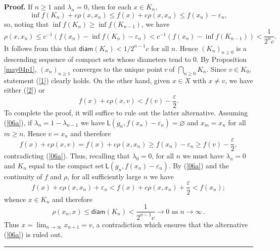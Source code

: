 \documentclass[11pt]{article}%
\newenvironment{proof}[1][Proof]{\noindent\textbf{#1.} }{\ \rule{0.5em}{0.5em}}
\begin{document}
\begin{proof}
If $n\geqslant1$ and $\lambda_{n}=0$, then for each $x\in K_{n}$,%
\[
\inf f(K_{n})+c\rho\left(  x,x_{n}\right)  \leqslant f\left(  x\right)
+c\rho\left(  x,x_{n}\right)  \leqslant f\left(  x_{n}\right)  -\varepsilon
_{n},
\]
so, noting that $\inf f(K_{n})\geqslant\inf f(K_{n-1})$, we have
\[
\rho\left(  x,x_{n}\right)  \leqslant c^{-1}(f\left(  x_{n}\right)  -\inf
f(K_{n})-\varepsilon_{n})<c^{-1}(f\left(  x_{n}\right)  -\inf f(K_{n-1}%
))<\frac{1}{2^{n}c}.
\]
It follows from this that $\mathsf{diam}(K_{n})<1/2^{n-1}c$ for all $n$. Hence
$\left(  K_{n}\right)  _{n\geqslant0}$ is a descending sequence of compact
sets whose diameters tend to $0$. By Proposition \ref{may04p1}, $\left(
x_{n}\right)  _{n\geqslant1}$ converges to the unique point$\ v~$of $%
{\textstyle\bigcap_{n\geqslant0}}
K_{n}$. Since $v\in K_{0}$, statement (\ref{1}) clearly holds. On the other
hand, given $x\in X$ with $x\neq v$, we have either (\ref{2}) or%
\begin{equation}
f\left(  x\right)  +c\rho\left(  x,v\right)  <f\left(  v\right)
-\frac{\varepsilon}{2}. \label{06a}%
\end{equation}
To complete the proof, it will suffice to rule out the latter alternative.
Assuming (\ref{06a}), if $\lambda_{n}=1-\lambda_{n-1}$ we have $\mathsf{L}%
(g_{n},f(x_{n})-\varepsilon_{n})=\varnothing$ and $x_{m}=x_{n}$ for all
$m\geqslant n$. Hence $v=x_{n}$ and therefore%
\[
f\left(  x\right)  +c\rho\left(  x,v\right)  =f\left(  x\right)  +c\rho\left(
x,x_{n}\right)  \geqslant f\left(  x_{n}\right)  -\varepsilon_{n}\geqslant
f\left(  v\right)  -\frac{\varepsilon}{2},
\]
contradicting (\ref{06a}). Thus, recalling that $\lambda_{0}=0$, for all $n$
we must have $\lambda_{n}=0$ and $K_{n}$ equal to the compact set$\ \mathsf{L}%
(g_{n},f(x_{n})-\varepsilon_{n})$. By (\ref{06a}) and the continuity of $f $
and $\rho$, for all sufficiently large $n$ we have%
\[
f(x)+c\rho(x,x_{n})+\varepsilon_{n}<f(x)+c\rho(x,x_{n})+\frac{\varepsilon}%
{2}<f(x_{n});
\]
whence $x\in K_{n}$ and therefore%
\[
\rho(x_{n},x)\leqslant\mathsf{diam}(K_{n})<\frac{1}{2^{n-1}c}\rightarrow
0\text{ as }n\rightarrow\infty\,.
\]
Thus $x=\lim_{n\rightarrow\infty}x_{n+1}=v$, a contradiction which ensures
that the alternative (\ref{06a}) is ruled out.
\end{proof}

%

\medskip
\end{document}
